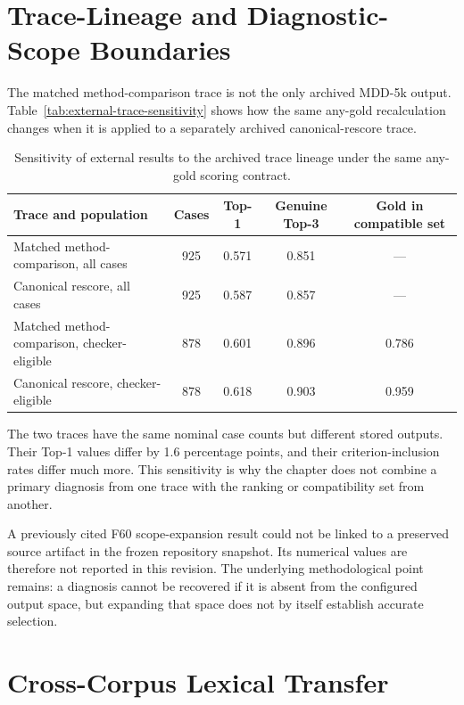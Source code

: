 \section{Trace-Lineage and Diagnostic-Scope Boundaries}
\label{sec:external-lineage-sensitivity}

The matched method-comparison trace is not the only archived MDD-5k output. Table~\ref{tab:external-trace-sensitivity} shows how the same any-gold recalculation changes when it is applied to a separately archived canonical-rescore trace.

\begin{table}[htbp]
\centering
\caption{Sensitivity of external results to the archived trace lineage under the same any-gold scoring contract.}
\label{tab:external-trace-sensitivity}
\label{tab:scope-expansion-results}
\small
\begin{tabularx}{\textwidth}{|>{\raggedright\arraybackslash}p{4.1cm}|c|c|c|c|}
\hline
\textbf{Trace and population} & \textbf{Cases} & \textbf{Top-1} & \textbf{Genuine Top-3} & \textbf{Gold in compatible set}\\
\hline
Matched method-comparison, all cases & 925 & 0.571 & 0.851 & ---\\
\hline
Canonical rescore, all cases & 925 & 0.587 & 0.857 & ---\\
\hline
Matched method-comparison, checker-eligible & 878 & 0.601 & 0.896 & 0.786\\
\hline
Canonical rescore, checker-eligible & 878 & 0.618 & 0.903 & 0.959\\
\hline
\end{tabularx}
\end{table}

The two traces have the same nominal case counts but different stored outputs. Their Top-1 values differ by 1.6 percentage points, and their criterion-inclusion rates differ much more. This sensitivity is why the chapter does not combine a primary diagnosis from one trace with the ranking or compatibility set from another.

A previously cited F60 scope-expansion result could not be linked to a preserved source artifact in the frozen repository snapshot. Its numerical values are therefore not reported in this revision. The underlying methodological point remains: a diagnosis cannot be recovered if it is absent from the configured output space, but expanding that space does not by itself establish accurate selection.

\section{Cross-Corpus Lexical Transfer}
\label{sec:external-lexical-transfer}

